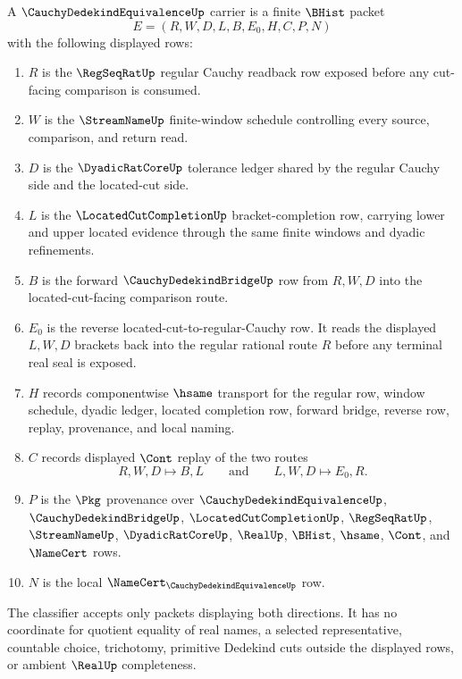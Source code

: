 \begin{definition}
\label{def:cauchy-dedekind-equivalence-carrier}
A $\CauchyDedekindEquivalenceUp$ carrier is a finite $\BHist$ packet
$$
E=(R,W,D,L,B,E_{0},H,C,P,N)
$$
with the following displayed rows:
\begin{enumerate}
\item $R$ is the $\RegSeqRatUp$ regular Cauchy readback row exposed before any cut-facing comparison is consumed.
\item $W$ is the $\StreamNameUp$ finite-window schedule controlling every source, comparison, and return read.
\item $D$ is the $\DyadicRatCoreUp$ tolerance ledger shared by the regular Cauchy side and the located-cut side.
\item $L$ is the $\LocatedCutCompletionUp$ bracket-completion row, carrying lower and upper located evidence through the same finite windows and dyadic refinements.
\item $B$ is the forward $\CauchyDedekindBridgeUp$ row from $R,W,D$ into the located-cut-facing comparison route.
\item $E_{0}$ is the reverse located-cut-to-regular-Cauchy row. It reads the displayed $L,W,D$ brackets back into the regular rational route $R$ before any terminal real seal is exposed.
\item $H$ records componentwise $\hsame$ transport for the regular row, window schedule, dyadic ledger, located completion row, forward bridge, reverse row, replay, provenance, and local naming.
\item $C$ records displayed $\Cont$ replay of the two routes
$$
R,W,D \longmapsto B,L
\qquad\text{and}\qquad
L,W,D \longmapsto E_{0},R .
$$
\item $P$ is the $\Pkg$ provenance over $\CauchyDedekindEquivalenceUp$, $\CauchyDedekindBridgeUp$, $\LocatedCutCompletionUp$, $\RegSeqRatUp$, $\StreamNameUp$, $\DyadicRatCoreUp$, $\RealUp$, $\BHist$, $\hsame$, $\Cont$, and $\NameCert$ rows.
\item $N$ is the local $\NameCert_{\CauchyDedekindEquivalenceUp}$ row.
\end{enumerate}
The classifier accepts only packets displaying both directions. It has no coordinate for quotient equality of real names, a selected representative, countable choice, trichotomy, primitive Dedekind cuts outside the displayed rows, or ambient $\RealUp$ completeness.
\end{definition}

